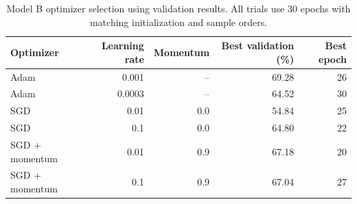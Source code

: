 \begin{table}[htbp]
\centering
\small
\begin{tabular}{lrrrr}
\hline
Optimizer & Learning rate & Momentum & Best validation (\%) & Best epoch \\
\hline
Adam & 0.001 & -- & 69.28 & 26 \\
Adam & 0.0003 & -- & 64.52 & 30 \\
SGD & 0.01 & 0.0 & 54.84 & 25 \\
SGD & 0.1 & 0.0 & 64.80 & 22 \\
SGD + momentum & 0.01 & 0.9 & 67.18 & 20 \\
SGD + momentum & 0.1 & 0.9 & 67.04 & 27 \\
\hline
\end{tabular}
\caption{Model B optimizer selection using validation results. All trials use 30 epochs with matching initialization and sample orders.}
\label{tab:realwaste-optimizers}
\end{table}
